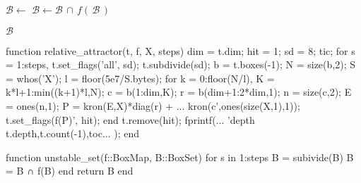 \documentclass[12pt,a4paper,twoside]{article}
\begin{document}

\begin{algorithm}
    \begin{algorithmic}[1]

            \State $\mathcal{B} \gets$ 
            \State $\mathcal{B} \gets \mathcal{B}\, \cap\, f (\,\mathcal{B}\,)$
        \EndFor

        \State \Return $\mathcal{B}$ 
    \end{algorithmic}
\end{algorithm}

\clearpage

\pagebreak

\begin{jllisting}[float, language=matlab, style=jlcodestyle, label=lst:gum:matlab, captionpos=b]
function relative_attractor(t, f, X, steps)
dim = t.dim; hit = 1; sd = 8; tic;
for s = 1:steps,
    t.set_flags('all', sd);
    t.subdivide(sd);
    b = t.boxes(-1); N = size(b,2);
    S = whos('X'); l = floor(5e7/S.bytes);
    for k = 0:floor(N/l), 
        K = k*l+1:min((k+1)*l,N);
        c = b(1:dim,K);  
        r = b(dim+1:2*dim,1);  
        n = size(c,2); E = ones(n,1);       
        P = kron(E,X)*diag(r) + ...  
            kron(c',ones(size(X,1),1));
        t.set_flags(f(P)', hit); 
    end
    t.remove(hit); 
    fprintf(...
        'depth %
        t.depth,t.count(-1),toc...
    );
end
\end{jllisting}

\clearpage

\pagebreak

\begin{jllisting}[float, language=julia, style=jlcodestyle, label=lst:gum:julia, captionpos=b]
    function unstable_set(f::BoxMap, B::BoxSet)
        for s in 1:steps
            B = subivide(B)
            B = B ∩ f(B)
        end
        return B
    end
\end{jllisting}
\end{document}
